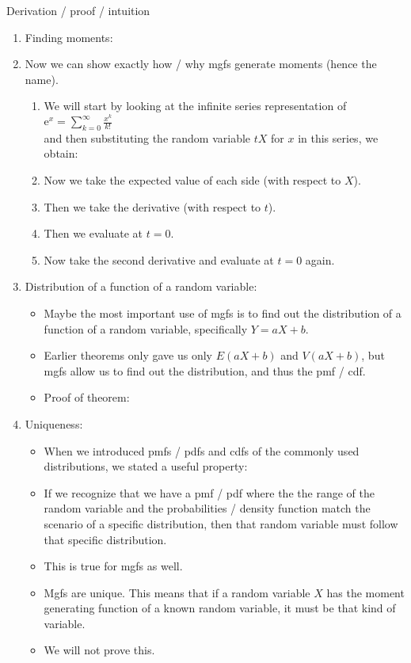 \documentclass{article}
\newcommand{\e}{\mathrm{e}}		%
\begin{document}
Derivation / proof / intuition\bigskip
\begin{enumerate}[(1)]
    \item Finding moments:
    \item[] Now we can show exactly how / why mgfs generate moments (hence the name).
    \begin{enumerate}
        \item We will start by looking at the infinite series representation of $\e^x = \displaystyle \sum_{k = 0}^{\infty} \frac{x^k}{k!}$ \\and then substituting the random variable $tX$ for $x$ in this series, we obtain:\vspace{30pt}
        \item Now we take the expected value of each side (with respect to $X$).\vspace{60pt}
        \item Then we take the derivative (with respect to $t$).\vspace{60pt}
        \item Then we evaluate at $t = 0$.\vspace{60pt}
        \item Now take the second derivative and evaluate at $t = 0$ again.\vspace{100pt}
    \end{enumerate}
    \item Distribution of a function of a random variable:\bigskip
    \begin{itemize}
        \item Maybe the most important use of mgfs is to find out the distribution of a function of a random variable, specifically $Y = aX + b$.
        \item Earlier theorems only gave us only $E(aX + b)$ and $V(aX + b)$, but mgfs allow us to find out the distribution, and thus the pmf / cdf.\bigskip
        \item Proof of theorem:\vspace{100pt}
    \end{itemize}\bigskip
    \item Uniqueness:
    \begin{itemize}
        \item When we introduced pmfs / pdfs and cdfs of the commonly used distributions, we stated a useful property:
        \item[] If we recognize that we have a pmf / pdf where the the range of the random variable and the probabilities / density function match the scenario of a specific distribution, then that random variable must follow that specific distribution.
        \item This is true for mgfs as well.
        \item[] Mgfs are unique. This means that if a random variable $X$ has the moment generating function of a known random variable, it must be that kind of variable.
        \item We will not prove this.
    \end{itemize}
\end{enumerate}\bigskip
\end{document}
